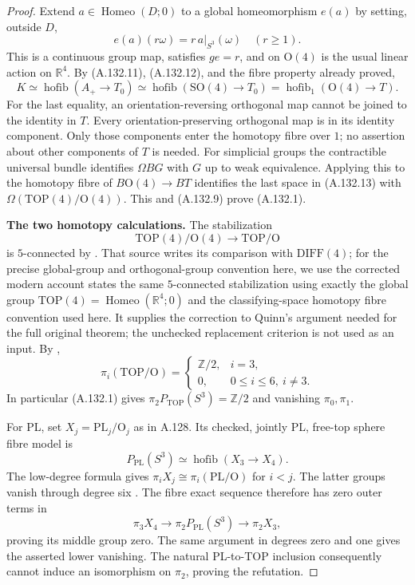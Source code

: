 \begin{proof}
Extend $a\in\operatorname{Homeo}(D;0)$ to a global homeomorphism
$e(a)$ by setting, outside $D$,
\[
 e(a)(r\omega)=r\,a|_{S^3}(\omega)\quad(r\geq1).
\]
This is a continuous group map, satisfies $g e=r$, and on
$\mathrm O(4)$ is the usual linear action on $\mathbb R^4$.
By (A.132.11), (A.132.12), and the fibre property already proved,
\[
 K\simeq\operatorname{hofib}(A_+\to T_0)
 \simeq\operatorname{hofib}(\mathrm{SO}(4)\to T_0)
 =\operatorname{hofib}_{1}(\mathrm O(4)\to T).
                                                        \tag{A.132.13}
\]
For the last equality, an orientation-reversing orthogonal map
cannot be joined to the identity in $T$. Every orientation-preserving
orthogonal map is in its identity component. Only those components
enter the homotopy fibre over $1$; no assertion about other
components of $T$ is needed.
For simplicial groups the contractible universal bundle identifies
$\Omega BG$ with $G$ up to weak equivalence. Applying this to the
homotopy fibre of $B\mathrm O(4)\to BT$ identifies the last space
in (A.132.13) with
$\Omega(\mathrm{TOP}(4)/\mathrm O(4))$. This and (A.132.9) prove
(A.132.1).

\smallskip\noindent
\textbf{The two homotopy calculations.}
The stabilization
\[
 \mathrm{TOP}(4)/\mathrm O(4)\longrightarrow\mathrm{TOP}/\mathrm O
\]
is $5$-connected by \cite[Theorem~8.7A, p.~128]{FreedmanQuinn1990}.
That source writes its comparison with $\mathrm{DIFF}(4)$;
for the precise global-group and orthogonal-group convention here,
we use the corrected modern account
\cite[\S1.1, Theorem~1.3 and the immediately following paragraph]
{GabaiGayHartmanKrushkalPowell2026} states the same
$5$-connected stabilization using exactly the global group
$\mathrm{TOP}(4)=\operatorname{Homeo}(\mathbb R^4;0)$ and the
classifying-space homotopy fibre convention used here.
It supplies the correction to Quinn's argument needed for the
full original theorem; the unchecked replacement criterion is
not used as an input.
By \cite[Essay~V, Theorem~5.5, p.~251]{KirbySiebenmann1977},
\[
 \pi_i(\mathrm{TOP}/\mathrm O)=
 \begin{cases}\mathbb Z/2,&i=3,\\0,&0\leq i\leq6,\ i\ne3.
 \end{cases}
\]
In particular (A.132.1) gives
$\pi_2P_{\mathrm{TOP}}(S^3)=\mathbb Z/2$ and vanishing
$\pi_0,\pi_1$.

For PL, set $X_j=\mathrm{PL}_j/\mathrm O_j$ as in A.128.
Its checked, jointly PL, free-top sphere fibre model is
\[
 P_{\mathrm{PL}}(S^3)\simeq
 \operatorname{hofib}(X_3\longrightarrow X_4).
\]
The low-degree formula
\cite[\S5, p.~37, formula~(3)]{BurgheleaLashof1974II} gives
$\pi_iX_j\cong\pi_i(\mathrm{PL}/\mathrm O)$ for $i<j$.
The latter groups vanish through degree six
\cite[Annex~C, p.~318]{KirbySiebenmann1977}.
The fibre exact sequence therefore has zero outer terms in
\[
 \pi_3X_4\longrightarrow\pi_2P_{\mathrm{PL}}(S^3)
 \longrightarrow\pi_2X_3,
\]
proving its middle group zero. The same argument in degrees
zero and one gives the asserted lower vanishing. The natural
PL-to-TOP inclusion consequently cannot induce an isomorphism
on $\pi_2$, proving the refutation.


\end{proof}
